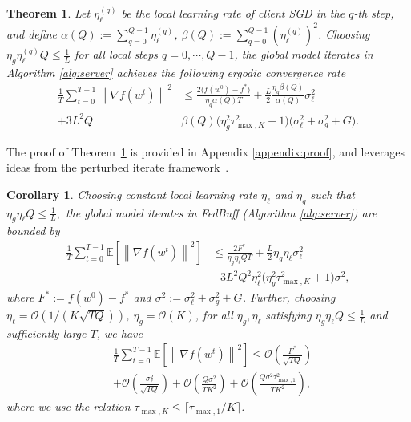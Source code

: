 \documentclass[twoside]{article}
\newtheorem{theorem}{Theorem}
\newtheorem{corollary}{Corollary}
\newcommand{\norm}[1]{\left\lVert#1\right\rVert}
\newcommand{\order}[1]{\mathcal{O}\left(#1\right)}
\newcommand{\algname}{{FedBuff}\xspace}
\begin{document}
\begin{theorem}
Let $\eta^{(q)}_{\ell}$ be the local learning rate of client SGD in the $q$-th step, and define $\alpha(Q):=\sum_{q=0}^{Q-1} \eta^{(q)}_{\ell}$, $\beta(Q):=\sum_{q=0}^{Q-1} (\eta^{(q)}_{\ell})^2$. Choosing $\eta_g \eta^{(q)}_{\ell} Q \leq \frac{1}{L}$ for all local steps $q=0,\cdots,Q-1$, the global model iterates in Algorithm \ref{alg:server} achieves the following ergodic convergence rate
\begin{equation}
    \begin{aligned}
        \frac{1}{T} \sum_{t=0}^{T-1} \norm{\nabla f(w^t)}^2 
         &\leq \frac{2 \Big(f(w^0) - f^* \Big)}{\eta_g \alpha(Q) T} +\frac{L}{2}\frac{\eta_g \beta(Q) }{ \alpha(Q)}   \sigma^2_{\ell} \\ + 3 L^2 Q  & \beta(Q)  \Big(\eta^2_g \tau_{\max, K}^2 + 1 \Big)  \Big(\sigma^2_{\ell} + \sigma^2_g +  G\Big).
    \end{aligned}
\end{equation}
\label{thm:main_ergodic_rate}
\end{theorem}
The proof of Theorem~\ref{thm:main_ergodic_rate} is provided in Appendix \ref{appendix:proof}, and leverages ideas from the perturbed iterate framework~\citep{AsyncSGD_purturbed}.
\begin{corollary}
Choosing constant local learning rate $\eta_{\ell}$ and $\eta_g$ such that $\eta_g \eta_{\ell} Q \leq \frac{1}{L},
$ the global model iterates in \algname{} (Algorithm \ref{alg:server}) are bounded by 
\begin{equation}
\begin{aligned}
        \frac{1}{T} \sum_{t=0}^{T-1} \mathbb{E}\left[\norm{\nabla f(w^t)}^2\right]
        &\leq \frac{2 F^*}{\eta_g \eta_{\ell} QT} +\frac{L}{2}\eta_g \eta_{\ell} \sigma_{\ell}^2 \\  &+ 3 L^2 Q^2\eta_{\ell}^2\Big(\eta^2_g  \tau_{\max, K}^2 + 1 \Big)  \sigma^2, 
         \end{aligned}
\end{equation}
where $F^* := f(w^0) - f^*$ and $\sigma^2 := \sigma^2_{\ell} + \sigma^2_g + G$. Further, choosing $\eta_{\ell} = \order{ 1/\left(K\sqrt{TQ}\right)}$, $\eta_g = \order{K}$, for all $\eta_g, \eta_{\ell}$ satisfying $\eta_g \eta_{\ell} Q \leq \frac{1}{L}$ and sufficiently large $T$, we have
\begin{equation}
\begin{aligned}
    & \frac{1}{T} \sum_{t=0}^{T-1} \mathbb{E}\left[\norm{\nabla f(w^t)}^2\right]
    \leq \order{ \frac{F^*}{\sqrt{TQ}} } \\ &+ \order{ \frac{ \sigma_{\ell}^2}{\sqrt{TQ}} }+ \order{ \frac{Q \sigma^2}{TK^2} } + \order{ \frac{ Q \sigma^2 \tau^2_{\max, 1}}{TK^2} },
     \end{aligned}
    \label{eq:constantLR_bound}
\end{equation}
\label{corollary:constant_LR_bound}
where we use the relation $\tau_{\max, K} \leq \lceil \tau_{\max, 1} / K \rceil$.
\end{corollary}
\end{document}

